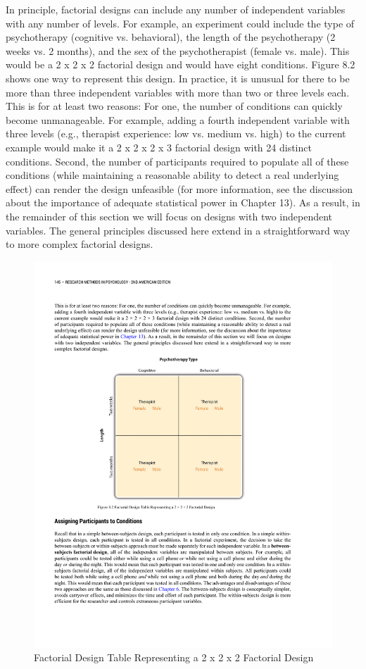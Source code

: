 In principle, factorial designs can include any number of independent variables with any number of levels. For example, an experiment could include the type of psychotherapy (cognitive vs. behavioral), the length of the psychotherapy (2 weeks vs. 2 months), and the sex of the psychotherapist (female vs. male). This would be a 2 x 2 x 2 factorial design and would have eight conditions. Figure 8.2 shows one way to represent this design. In practice, it is unusual for there to be more than three independent variables with more than two or three levels each.
This is for at least two reasons: For one, the number of conditions can quickly become unmanageable. For example, adding a fourth independent variable with three levels (e.g., therapist experience: low vs. medium vs. high) to the current example would make it a 2 x 2 x 2 x 3 factorial design with 24 distinct conditions. Second, the number of participants required to populate all of these conditions (while maintaining a reasonable ability to detect a real underlying effect) can render the design unfeasible (for more information, see the discussion about the importance of adequate statistical power in Chapter 13). As a result, in the remainder of this section we will focus on designs with two independent variables. The general principles discussed here extend in a straightforward way to more complex factorial designs.

\begin{figure}

\includegraphics[width=.7\linewidth]{figures/C83way.pdf}

\caption{Factorial Design Table Representing a 2 x 2 x 2 Factorial Design}

\label{fig:3way}

\end{figure}

